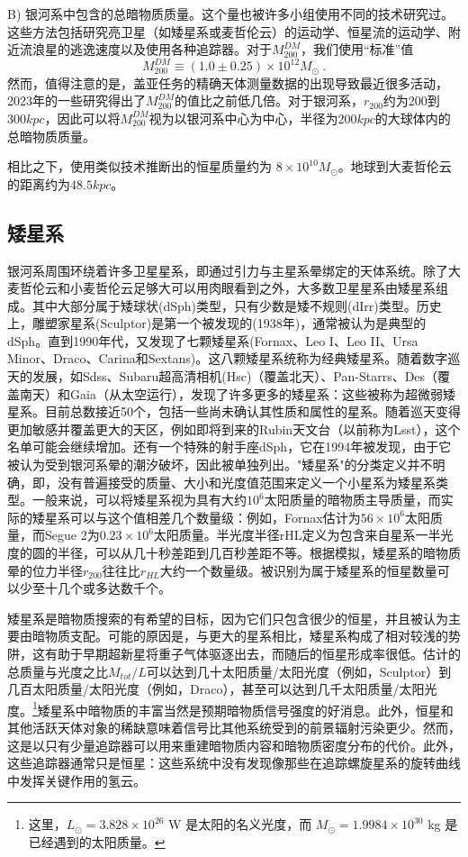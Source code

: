 B) 银河系中包含的总暗物质质量。这个量也被许多小组使用不同的技术研究过。这些方法包括研究亮卫星（如矮星系或麦哲伦云）的运动学、恒星流的运动学、附近流浪星的逃逸速度以及使用各种追踪器。对于$M^{DM}_{200}$，我们使用“标准”值
\begin{equation}
M^{DM}_{200} \equiv (1.0 \pm 0.25) \times 10^{12} M_\odot ~.
\end{equation} 
然而，值得注意的是，盖亚任务的精确天体测量数据的出现导致最近很多活动，2023年的一些研究得出了$M^{DM}_{200}$的值比之前低几倍。对于银河系，$r_{200}$约为$200$到$300 kpc$，因此可以将$M^{DM}_{200}$视为以银河系中心为中心，半径为$200 kpc$的大球体内的总暗物质质量。

相比之下，使用类似技术推断出的恒星质量约为 \(8 \times 10^{10} M_\odot\)。地球到大麦哲伦云的距离约为$48.5 kpc$。

\subsection{矮星系} 

银河系周围环绕着许多卫星星系，即通过引力与主星系晕绑定的天体系统。除了大麦哲伦云和小麦哲伦云足够大可以用肉眼看到之外，大多数卫星星系由矮星系组成。其中大部分属于矮球状(dSph)类型，只有少数是矮不规则(dIrr)类型。历史上，雕塑家星系(Sculptor)是第一个被发现的(1938年)，通常被认为是典型的dSph。直到1990年代，又发现了七颗矮星系(Fornax、Leo I、Leo II、Ursa Minor、Draco、Carina和Sextans)。这八颗矮星系统称为经典矮星系。随着数字巡天的发展，如Sdss、Subaru超高清相机(Hsc)（覆盖北天）、Pan-Starrs、Des（覆盖南天）和Gaia（从太空运行），发现了许多更多的矮星系：这些被称为超微弱矮星系。目前总数接近50个，包括一些尚未确认其性质和属性的星系。随着巡天变得更加敏感并覆盖更大的天区，例如即将到来的Rubin天文台（以前称为Lsst），这个名单可能会继续增加。还有一个特殊的射手座dSph，它在1994年被发现，由于它被认为受到银河系晕的潮汐破坏，因此被单独列出。"矮星系"的分类定义并不明确，即，没有普遍接受的质量、大小和光度值范围来定义一个小星系为矮星系类型。一般来说，可以将矮星系视为具有大约$10^6$太阳质量的暗物质主导质量，而实际的矮星系可以与这个值相差几个数量级：例如，Fornax估计为$56\times10^6$太阳质量，而Segue 2为$0.23\times 10^6$太阳质量。半光度半径rHL定义为包含来自星系一半光度的圆的半径，可以从几十秒差距到几百秒差距不等。根据模拟，矮星系的暗物质晕的位力半径$r_{200}$往往比$r_{HL}$大约一个数量级。被识别为属于矮星系的恒星数量可以少至十几个或多达数千个。

矮星系是暗物质搜索的有希望的目标，因为它们只包含很少的恒星，并且被认为主要由暗物质支配。可能的原因是，与更大的星系相比，矮星系构成了相对较浅的势阱，这有助于早期超新星将重子气体驱逐出去，而随后的恒星形成率很低。估计的总质量与光度之比$M_{tot}/L$可以达到几十太阳质量/太阳光度（例如，Sculptor）到几百太阳质量/太阳光度（例如，Draco），甚至可以达到几千太阳质量/太阳光度。\footnote{这里，\( L_\odot = 3.828 \times 10^{26} \) W 是太阳的名义光度，而 \( M_\odot = 1.9984 \times 10^{30} \) kg 是已经遇到的太阳质量。}矮星系中暗物质的丰富当然是预期暗物质信号强度的好消息。此外，恒星和其他活跃天体对象的稀缺意味着信号比其他系统受到的前景辐射污染更少。然而，这是以只有少量追踪器可以用来重建暗物质内容和暗物质密度分布的代价。此外，这些追踪器通常只是恒星：这些系统中没有发现像那些在追踪螺旋星系的旋转曲线中发挥关键作用的氢云。

